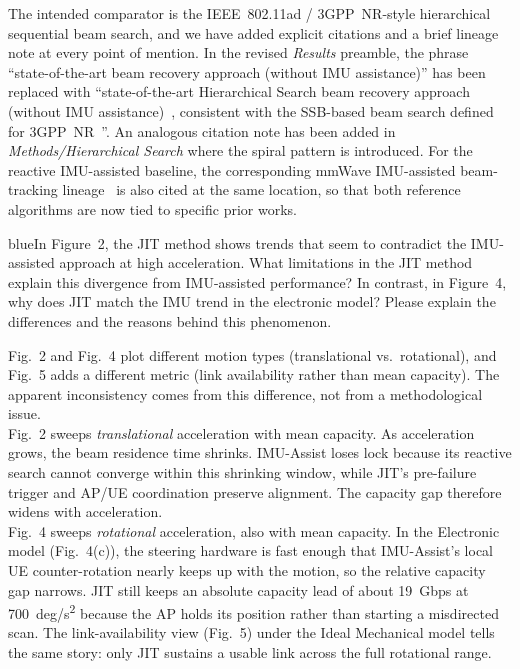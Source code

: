 \documentclass{article}
\newcommand{\blue}[1]{\begin{color}{blue}#1\end{color}}
\begin{document}
\noindent The intended comparator is the IEEE~802.11ad / 3GPP~NR-style hierarchical sequential beam search, and we have added explicit citations and a brief lineage note at every point of mention. In the revised \emph{Results} preamble, the phrase ``state-of-the-art beam recovery approach (without IMU assistance)'' has been replaced with ``state-of-the-art Hierarchical Search beam recovery approach (without IMU assistance)~\cite{photonics11060540}, consistent with the SSB-based beam search defined for 3GPP~NR~\cite{Giordani2018ATO, Heng2021SixChallenges}''. An analogous citation note has been added in \emph{Methods/Hierarchical Search} where the spiral pattern is introduced. For the reactive IMU-assisted baseline, the corresponding mmWave IMU-assisted beam-tracking lineage~\cite{s141019622, Brambilla_2019, 9391649} is also cited at the same location, so that both reference algorithms are now tied to specific prior works.

\begin{tcbremark}
{\selectfont
\blue{In Figure~2, the JIT method shows trends that seem to contradict the IMU-assisted approach at high acceleration. What limitations in the JIT method explain this divergence from IMU-assisted performance? In contrast, in Figure~4, why does JIT match the IMU trend in the electronic model? Please explain the differences and the reasons behind this phenomenon.}
}
\end{tcbremark}

\noindent Fig.~2 and Fig.~4 plot different motion types (translational vs.\ rotational), and Fig.~5 adds a different metric (link availability rather than mean capacity). The apparent inconsistency comes from this difference, not from a methodological issue.\\

\noindent Fig.~2 sweeps \emph{translational} acceleration with mean capacity. As acceleration grows, the beam residence time shrinks. IMU-Assist loses lock because its reactive search cannot converge within this shrinking window, while JIT's pre-failure trigger and AP/UE coordination preserve alignment. The capacity gap therefore widens with acceleration.\\

\noindent Fig.~4 sweeps \emph{rotational} acceleration, also with mean capacity. In the Electronic model (Fig.~4(c)), the steering hardware is fast enough that IMU-Assist's local UE counter-rotation nearly keeps up with the motion, so the relative capacity gap narrows. JIT still keeps an absolute capacity lead of about \SI{19}{Gbps} at \SI{700}{deg/s^2} because the AP holds its position rather than starting a misdirected scan. The link-availability view (Fig.~5) under the Ideal Mechanical model tells the same story: only JIT sustains a usable link across the full rotational range.\\
\end{document}

